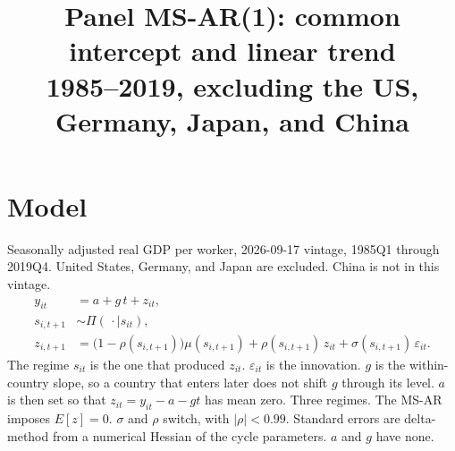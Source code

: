 \documentclass[11pt]{article}
\title{Panel MS-AR(1): common intercept and linear trend\\[0.4em]\large 1985--2019, excluding the US, Germany, Japan, and China}
\author{}
\date{}
\begin{document}
\maketitle
\section{Model}
Seasonally adjusted real GDP per worker, 2026-09-17 vintage, 1985Q1 through 2019Q4. United States, Germany, and Japan are excluded. China is not in this vintage.
\begin{align}
y_{it} &= a + g\, t + z_{it}, \\
s_{i,t+1} &\sim \Pi(\,\cdot\mid s_{it}), \\
z_{i,t+1} &= \bigl(1-\rho(s_{i,t+1})\bigr)\mu(s_{i,t+1}) + \rho(s_{i,t+1})\, z_{it} + \sigma(s_{i,t+1})\,\varepsilon_{it}.
\end{align}
The regime $s_{it}$ is the one that produced $z_{it}$. $\varepsilon_{it}$ is the innovation. $g$ is the within-country slope, so a country that enters later does not shift $g$ through its level. $a$ is then set so that $z_{it}=y_{it}-a-gt$ has mean zero. Three regimes. The MS-AR imposes $E[z]=0$. $\sigma$ and $\rho$ switch, with $|\rho|<0.99$. Standard errors are delta-method from a numerical Hessian of the cycle parameters. $a$ and $g$ have none.
\clearpage
\end{document}
